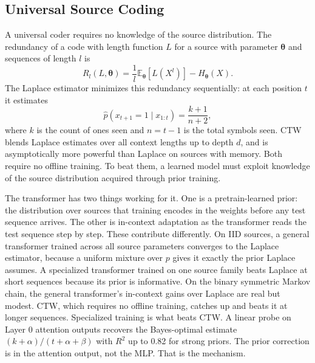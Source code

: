 \documentclass[onecolumn,english,12pt]{IEEEtran}
\begin{document}
\subsection{Universal Source Coding}
\label{sec:universal}

A universal coder requires no knowledge of the source distribution. The redundancy of a code with length function $L$ for a source with parameter $\boldsymbol{\theta}$ and sequences of length $l$ is
\begin{equation}
  R_l(L, \boldsymbol{\theta}) = \frac{1}{l}\mathbb{E}_{\boldsymbol{\theta}}[L(X^l)] - H_{\boldsymbol{\theta}}(X).
  \label{eq:redun}
\end{equation}
The Laplace estimator minimizes this redundancy sequentially: at each position $t$ it estimates
\begin{equation}
  \hat{p}(x_{t+1}=1 \mid x_{1:t}) = \frac{k+1}{n+2},
  \label{eq:laplace_intro}
\end{equation}
where $k$ is the count of ones seen and $n = t-1$ is the total symbols seen. CTW~\cite{gabeschamberg} blends Laplace estimates over all context lengths up to depth $d$, and is asymptotically more powerful than Laplace on sources with memory. Both require no offline training. To beat them, a learned model must exploit knowledge of the source distribution acquired through prior training.

The transformer has two things working for it.
One is a pretrain-learned prior: the distribution over sources that training encodes in the weights before any test sequence arrives.
The other is in-context adaptation as the transformer reads the test sequence step by step.
These contribute differently.
On IID sources, a general transformer trained across all source parameters converges to the Laplace estimator, because a uniform mixture over $p$ gives it exactly the prior Laplace assumes.
A specialized transformer trained on one source family beats Laplace at short sequences because its prior is informative.
On the binary symmetric Markov chain, the general transformer's in-context gains over Laplace are real but modest. CTW, which requires no offline training, catches up and beats it at longer sequences.
Specialized training is what beats CTW.
A linear probe on Layer 0 attention outputs recovers the Bayes-optimal estimate $(k+\alpha)/(t+\alpha+\beta)$ with $R^2$ up to 0.82 for strong priors.
The prior correction is in the attention output, not the MLP.
That is the mechanism.

\end{document}
